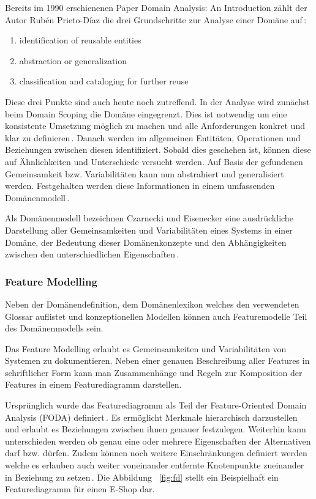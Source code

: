 \documentclass[12pt,oneside,a4paper,parskip]{scrbook}
\begin{document}
Bereits im 1990 erschienenen Paper Domain Analysis: An Introduction zählt der Autor Rubén Prieto-Díaz die drei Grundschritte zur Analyse einer Domäne auf\,\cite{prieto1990}:

\begin{enumerate}[itemsep=-10pt]
	\item identification of reusable entities 
	\item abstraction or generalization 
	\item classification and cataloging for further reuse
\end{enumerate}

Diese drei Punkte sind auch heute noch zutreffend. In der Analyse wird zunächst beim Domain Scoping die Domäne eingegrenzt. Dies ist notwendig um eine konsistente Umsetzung möglich zu machen und alle Anforderungen konkret und klar zu definieren\,\cite[S. 239]{stahl2007}. Danach werden im allgemeinen Entitäten, Operationen und Beziehungen zwischen diesen identifiziert. Sobald dies geschehen ist, können diese auf Ähnlichkeiten und Unterschiede versucht werden. Auf Basis der gefundenen Gemeinsamkeit bzw. Variabilitäten kann nun abstrahiert und generalisiert werden. Festgehalten werden diese Informationen in einem umfassenden Domänenmodell\,\cite[S. 24ff.]{czaeis2000}.

Als Domänenmodell bezeichnen Czarnecki und Eisenecker eine ausdrückliche Darstellung aller Gemeinsamkeiten und Variabilitäten eines Systems in einer Domäne, der Bedeutung dieser Domänenkonzepte und den Abhängigkeiten zwischen den unterschiedlichen Eigenschaften\,\cite[S. 23f.]{czaeis2000}.

\subsubsection{Feature Modelling}

Neben der Domänendefinition, dem Domänenlexikon welches den verwendeten Glossar auflistet und konzeptionellen Modellen können auch Featuremodelle Teil des Domänenmodells sein. 

Das Feature Modelling erlaubt es Gemeinsamkeiten und Variabilitäten von Systemen zu dokumentieren. Neben einer genauen Beschreibung aller Features in schriftlicher Form kann man Zusammenhänge und Regeln zur Komposition der Features in einem Featurediagramm darstellen.

Ursprünglich wurde das Featurediagramm als Teil der Feature-Oriented Domain Analysis (FODA) definiert\,\cite{kang1990}. Es ermöglicht Merkmale hierarchisch darzustellen und erlaubt es Beziehungen zwischen ihnen genauer festzulegen. Weiterhin kann unterschieden werden ob genau eine oder mehrere Eigenschaften der Alternativen darf bzw. dürfen. Zudem können noch weitere Einschränkungen definiert werden welche es erlauben auch weiter voneinander entfernte Knotenpunkte zueinander in Beziehung zu setzen\,\cite[S. 240f.]{stahl2007}. Die Abbildung ~\ref{fig:fd} stellt ein Beispielhaft ein Featurediagramm für einen E-Shop dar.
\end{document}
